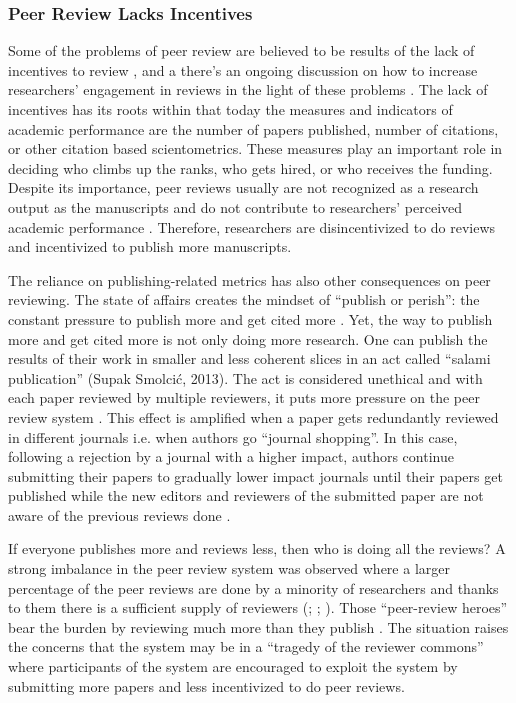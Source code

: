\subsubsection{Peer Review Lacks Incentives}

Some of the problems of peer review are believed to be results of the lack of incentives to review \parencite{Derraik.2015, Willis.2016}, and a there’s an ongoing discussion on how to increase researchers’ engagement in reviews in the light of these problems \parencite{Derraik.2015, Gasparyan.2015, Hauser.2007, Squazzoni.2013}. The lack of incentives has its roots within that today the measures and indicators of academic performance are the number of papers published, number of citations, or other citation based scientometrics. These measures play an important role in deciding who climbs up the ranks, who gets hired, or who receives the funding. Despite its importance, peer reviews usually are not recognized as a research output as the manuscripts and do not contribute to researchers’ perceived academic performance \parencite{Tennant.2017}. Therefore, researchers are disincentivized to do reviews and incentivized to publish more manuscripts.

The reliance on publishing-related metrics has also other consequences on peer reviewing. The state of affairs creates the mindset of “publish or perish”: the constant pressure to publish more and get cited more \parencite{Rawat.2014}. Yet, the way to publish more and get cited more is not only doing more research. One can publish the results of their work in smaller and less coherent slices \parencite[4]{Ferreira.2016} in an act called “salami publication” \parencite{SupakSmolcic.2013} (Supak Smolcić, 2013). The act is considered unethical \parencite[238]{SupakSmolcic.2013} and with each paper reviewed by multiple reviewers, it puts more pressure on the peer review system \parencite[4]{Ferreira.2016}. This effect is amplified when a paper gets redundantly reviewed in different journals i.e. when authors go “journal shopping”. In this case, following a rejection by a journal with a higher impact, authors continue submitting their papers to gradually lower impact journals until their papers get published while the new editors and reviewers of the submitted paper are not aware of the previous reviews done \parencite[10]{Kovanis.2016}. 

If everyone publishes more and reviews less, then who is doing all the reviews? A strong imbalance in the peer review system was observed where a larger percentage of the peer reviews are done by a minority of researchers and thanks to them there is a sufficient supply of reviewers (\cite{Kovanis.2016}; \cite{Petchey.2014}; \cite[37]{Ware.2008}). Those “peer-review heroes” bear the burden by reviewing much more than they publish \parencite[9]{Kovanis.2016}. The situation raises the concerns that the system may be in a “tragedy of the reviewer commons” \parencite{Hochberg.2009} where participants of the system are encouraged to exploit the system by submitting more papers and less incentivized to do peer reviews. 

